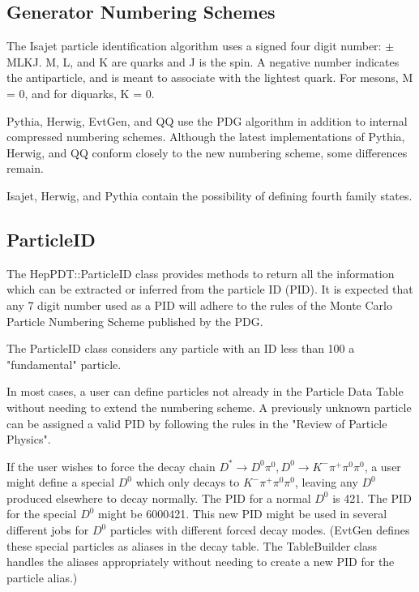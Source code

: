 \subsection { Generator Numbering Schemes }

The Isajet particle identification algorithm uses a signed four digit
number: $\pm$MLKJ.  M, L, and K are quarks and J is the spin.  A negative
number indicates the antiparticle, and is meant to associate with the
lightest quark.  For mesons, M = 0, and for diquarks, K = 0.

Pythia, Herwig, EvtGen, and QQ use the PDG algorithm in addition to internal
compressed numbering schemes.
Although the latest implementations of Pythia, Herwig, and QQ conform closely
to the new numbering scheme, some differences remain.

Isajet, Herwig, and Pythia contain the possibility of
defining fourth family states. 

\subsection { ParticleID }

The HepPDT::ParticleID class  
provides methods to return all the information
which can be extracted or inferred from the particle ID (PID).
It is expected that any 7 digit number used as a PID will adhere to the 
rules of the Monte Carlo Particle Numbering Scheme published by the
PDG.\cite{pdg}

The ParticleID class considers any particle with 
an ID less than 100 a "fundamental" particle.

In most cases, a user can define particles not already in the
Particle Data Table without needing to extend the numbering scheme.
A previously unknown particle can be assigned a valid PID by
following the rules in the "Review of Particle Physics".\cite{pdg}

If the user wishes to force the decay chain 
$D^* \rightarrow D^0 \pi^0, D^0 \rightarrow K^- \pi^+ \pi^0 \pi^0$,
a user might define a special $D^0$ which only decays to 
$K^- \pi^+ \pi^0 \pi^0$, leaving any $D^0$ produced elsewhere to decay normally.
The PID for a normal $D^0$ is 421.  The PID for the special $D^0$
might be 6000421.   This new PID might be used in several different jobs
for $D^0$ particles with different forced decay modes.
(EvtGen defines these special particles as aliases in the decay table.
The TableBuilder class handles the aliases appropriately without needing
to create a new PID for the particle alias.)

